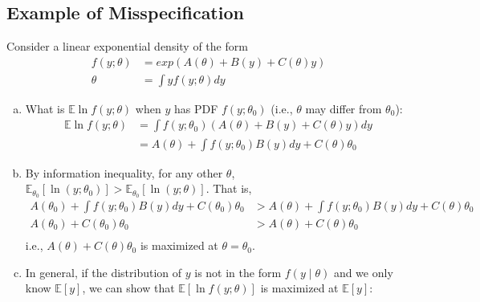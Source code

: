 \documentclass[11pt]{elegantbook}
\begin{document}
\subsection{Example of Misspecification}
\begin{example}
    Consider a linear exponential density of the form
    \begin{equation}
        \begin{aligned}
            f(y;\theta)&=exp\left(A(\theta)+B(y)+C(\theta)y\right)\\
            \theta&=\int yf(y;\theta)dy
        \end{aligned}
        \nonumber
    \end{equation}
\end{example}
\begin{enumerate}[(a).]
    \item What is $\mathbb{E} \ln f(y ; \theta)$ when $y$ has PDF $f(y ; \theta_0)$ (i.e., $\theta$ may differ from $\theta_0$):
    \begin{equation}
        \begin{aligned}
            \mathbb{E}\ln f(y;\theta)&=\int f(y ; \theta_0) \left(A(\theta)+B(y)+C(\theta)y\right)dy\\
            &=A(\theta)+\int f(y ; \theta_0)B(y)dy+C(\theta)\theta_0
        \end{aligned}
        \nonumber
    \end{equation}
    \item By information inequality, for any other $\theta$, $\mathbb{E}_{\theta_0}[\ln (y;\theta_0)]>\mathbb{E}_{\theta_0}[\ln (y;\theta)]$. That is,
    \begin{equation}
        \begin{aligned}
            A(\theta_0)+\int f(y ; \theta_0)B(y)dy+C(\theta_0)\theta_0&>A(\theta)+\int f(y ; \theta_0)B(y)dy+C(\theta)\theta_0\\
            A(\theta_0)+C(\theta_0)\theta_0&>A(\theta)+C(\theta)\theta_0\\
        \end{aligned}
        \nonumber
    \end{equation}
    i.e., $A(\theta)+C(\theta)\theta_0$ is maximized at $\theta=\theta_0$.
    \item In general, if the distribution of $y$ is not in the form $f(y\mid \theta)$ and we only know $\mathbb{E}[y]$, we can show that $\mathbb{E}[\ln f(y;\theta)]$ is maximized at $\mathbb{E}[y]$:
    \begin{equation}

\end{equation}
\end{enumerate}
\end{document}
